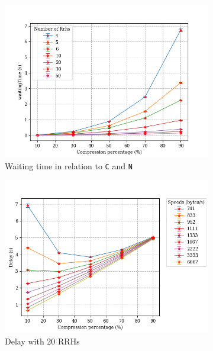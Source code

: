 \documentclass[11pt,a4paper,oneside, openright]{article}
\begin{document}
\begin{figure}
\centering
\begin{subfigure}{.5\textwidth}
  \centering
  \includegraphics[width=\linewidth]{images/c-vs-waiting}
  \caption{Waiting time in relation to \texttt{C} and \texttt{N}}
  \label{fig:c-vs-waiting-1}
\end{subfigure}%
\begin{subfigure}{.5\textwidth}
  \centering
  \includegraphics[width=\linewidth]{images/c-vs-delay}
  \caption{Delay with 20 RRHs}
  \label{fig:c-vs-delay}
\end{subfigure}
\caption{}
\label{fig:waiting-and-delay}
\end{figure}
\end{document}
